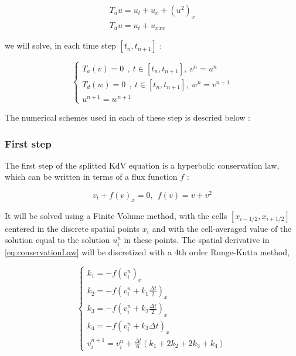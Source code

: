 \begin{gather}
	T_a{u} = u_t + u_x + (u^2)_x \\
	T_d{u} = u_t + u_{xxx}
\end{gather}

 
\noindent we will solve, in each time step $[t_n,t_{n+1}]$ :

\begin{equation}
\begin{cases}
   T_a(v) = 0 \ \ ,\ t \in [t_n,t_{n+1}], \  v^n = u^n \\
   T_d(w) = 0 \ \ , \ t \in [t_n,t_{n+1}], \  w^n = v^{n+1} \\
    u^{n+1} = w^{n+1}
\end{cases}
\end{equation}

\indent The numerical schemes used in each of these step is descried below :

\subsubsection{First step}
\label{sec:KdVSplitted1}

\indent The first step of the splitted KdV equation is a hyperbolic conservation law, which can be written in terms of a flux function $f$ :

\begin{equation}
  \label{eq:conservationLaw}
	v_t + f(v)_x = 0, \ \ f(v) = v + v^2
\end{equation}

\indent It will be solved using a Finite Volume method, with the cells $[x_{i-1/2}, x_{i+1/2}]$ centered in the discrete spatial points $x_i$ and with the cell-averaged value of the solution equal to the solution $u_i^n$ in these points. The spatial derivative in \eqref{eq:conservationLaw} will be discretized with a 4th order Runge-Kutta method,

\begin{equation}
\begin{cases}
k_1 = - f(v_i^n)_x \\
k_2 = - f\left(v_i^n + k_1\frac{\Delta t }{2}\right)_x \\
k_3 = - f\left(v_i^n + k_2\frac{\Delta t }{2}\right)_x \\
k_4 = - f(v_i^n + k_3 \Delta t)_x \\
v_i^{n+1} = v_i^n + \frac{\Delta t}{6}(k_1 + 2k_2 + 2k_3 + k_4)
\end{cases}
\end{equation}

